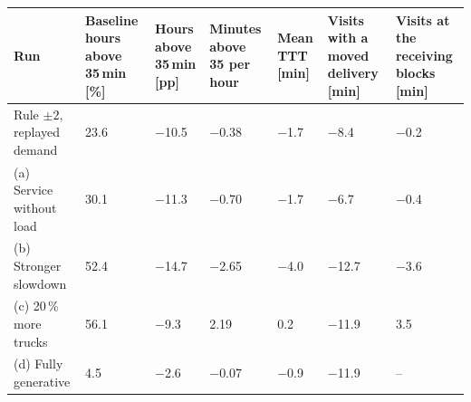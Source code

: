\begin{table}[htbp]
\centering
\scriptsize
\setlength{\tabcolsep}{3pt}
\begin{tabularx}{\textwidth}{L{3.2cm}YYYYYY}
\toprule
\textbf{Run} & \textbf{Baseline hours above 35\,min [\%]} & \textbf{Hours above 35\,min [pp]} & \textbf{Minutes above 35 per hour} & \textbf{Mean TTT [min]} & \textbf{Visits with a moved delivery [min]} & \textbf{Visits at the receiving blocks [min]} \\
\midrule
Rule $\pm 2$, replayed demand & 23.6 & $-$10.5\newline [$-$14.1, $-$6.8] & $-$0.38\newline [$-$0.66, $-$0.10] & $-$1.7\newline [$-$2.2, $-$1.2] & $-$8.4\newline [$-$9.0, $-$7.7] & $-$0.2\newline [$-$0.7, 0.2] \\
\midrule
(a) Service without load & 30.1 & $-$11.3\newline [$-$14.3, $-$8.3] & $-$0.70\newline [$-$0.90, $-$0.50] & $-$1.7\newline [$-$2.0, $-$1.3] & $-$6.7\newline [$-$7.1, $-$6.2] & $-$0.4\newline [$-$0.8, 0.1] \\
(b) Stronger slowdown & 52.4 & $-$14.7\newline [$-$16.8, $-$12.5] & $-$2.65\newline [$-$3.07, $-$2.24] & $-$4.0\newline [$-$4.6, $-$3.5] & $-$12.7\newline [$-$13.4, $-$12.1] & $-$3.6\newline [$-$4.3, $-$2.9] \\
(c) 20\,\% more trucks & 56.1 & $-$9.3\newline [$-$13.0, $-$5.6] & 2.19\newline [$-$1.92, 6.31] & 0.2\newline [$-$3.4, 3.8] & $-$11.9\newline [$-$15.7, $-$8.2] & 3.5\newline [0.2, 6.8] \\
(d) Fully generative & 4.5 & $-$2.6\newline [$-$3.8, $-$1.4] & $-$0.07\newline [$-$0.11, $-$0.03] & $-$0.9\newline [$-$1.1, $-$0.8] & $-$11.9\newline [$-$12.4, $-$11.3] & -- \\

\end{tabularx}
\end{table}
